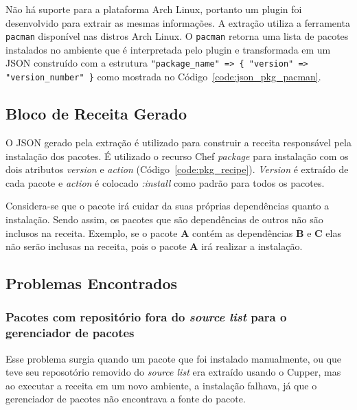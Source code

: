 Não há suporte para a plataforma Arch Linux, portanto um plugin foi desenvolvido
para extrair as mesmas informações. A extração utiliza a ferramenta \texttt{pacman} disponível
nas distros Arch Linux. O \texttt{pacman} retorna uma lista de pacotes instalados no ambiente
que é interpretada pelo plugin e transformada em um JSON construído com a estrutura
\texttt{"package\_name" => \{ "version" => "version\_number" \}} como mostrada no
Código~\ref{code:json_pkg_pacman}.

\noindent\begin{minipage}{\textwidth}
  \lstset{style=shell}
  
\end{minipage}\hfill

\subsection{Bloco de Receita Gerado}

O JSON gerado pela extração é utilizado para construir a receita responsável pela instalação dos
pacotes. É utilizado o recurso Chef \textit{package} para instalação com os dois atributos
\textit{version} e \textit{action} (Código~\ref{code:pkg_recipe}). \textit{Version}
é extraído de cada pacote e \textit{action} é colocado \textit{\textit{:install}} como padrão para todos os pacotes.

\noindent\begin{minipage}{\textwidth}
  \lstset{style=shell}
  
\end{minipage}\hfill

Considera-se que o pacote irá cuidar da suas próprias dependências quanto a instalação.
Sendo assim, os pacotes que são dependências de outros não são inclusos na receita. Exemplo, se o pacote
\textbf{A} contém as dependências \textbf{B} e \textbf{C} elas não serão inclusas na receita, pois o pacote \textbf{A} irá realizar a instalação.

\subsection{Problemas Encontrados}

\subsubsection{Pacotes com repositório fora do \textit{source list} para o 
gerenciador de pacotes}
Esse problema surgia quando um pacote que foi instalado manualmente, ou que
teve seu reposotório removido do \textit{source list} era extraído usando o Cupper,
mas ao executar a receita em um novo ambiente, a instalação falhava, já que 
o gerenciador de pacotes não encontrava a fonte do pacote.

